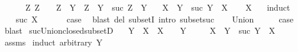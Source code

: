 \begin{isabellebody}
\ \ \ \ \ {\isacharasterisk}{\kern0pt}{\isacharcolon}{\kern0pt}\ {\isachardoublequoteopen}{\isasymAnd}Z{\isachardot}{\kern0pt}\ Z\ {\isasymin}\ {\isasymC}\ {\isasymLongrightarrow}\ Z\ {\isasymsubseteq}\ Y\ {\isasymLongrightarrow}\ Z\ {\isacharequal}{\kern0pt}\ Y\ {\isasymor}\ suc\ Z\ {\isasymsubseteq}\ Y{\isachardoublequoteclose}\isanewline
\ \ \ {\isachardoublequoteopen}X\ {\isasymsubseteq}\ Y\ {\isasymor}\ suc\ Y\ {\isasymsubseteq}\ X{\isachardoublequoteclose}\isanewline
%
\isadelimproof
\ \ %
\endisadelimproof
%
\isatagproof
{}\isamarkupfalse%
\ {\isacartoucheopen}X\ {\isasymin}\ {\isasymC}{\isacartoucheclose}\isanewline
{}\isamarkupfalse%
\ induct\isanewline
\ \ \isamarkupfalse%
\ {\isacharparenleft}{\kern0pt}suc\ X{\isacharparenright}{\kern0pt}\isanewline
\ \ \isamarkupfalse%
\ {\isacharasterisk}{\kern0pt}\ \isamarkupfalse%
\ {\isacharquery}{\kern0pt}case\ \isamarkupfalse%
\ {\isacharparenleft}{\kern0pt}blast\ del{\isacharcolon}{\kern0pt}\ subsetI\ intro{\isacharcolon}{\kern0pt}\ subset{\isacharunderscore}{\kern0pt}suc{\isacharparenright}{\kern0pt}\isanewline
{}\isamarkupfalse%
\isanewline
\ \ \isamarkupfalse%
\ Union\isanewline
\ \ \isamarkupfalse%
\ \isamarkupfalse%
\ {\isacharquery}{\kern0pt}case\ \isamarkupfalse%
\ blast\isanewline
{}\isamarkupfalse%
%
\endisatagproof
{\isafoldproof}%
%
\isadelimproof
\isanewline
%
\endisadelimproof
\isanewline
{}\isamarkupfalse%
\ suc{\isacharunderscore}{\kern0pt}Union{\isacharunderscore}{\kern0pt}closed{\isacharunderscore}{\kern0pt}subsetD{\isacharcolon}{\kern0pt}\isanewline
\ \ \ {\isachardoublequoteopen}Y\ {\isasymsubseteq}\ X{\isachardoublequoteclose}\ \ {\isachardoublequoteopen}X\ {\isasymin}\ {\isasymC}{\isachardoublequoteclose}\ \ {\isachardoublequoteopen}Y\ {\isasymin}\ {\isasymC}{\isachardoublequoteclose}\isanewline
\ \ \ {\isachardoublequoteopen}X\ {\isacharequal}{\kern0pt}\ Y\ {\isasymor}\ suc\ Y\ {\isasymsubseteq}\ X{\isachardoublequoteclose}\isanewline
%
\isadelimproof
\ \ %
\endisadelimproof
%
\isatagproof
{}\isamarkupfalse%
\ assms{\isacharparenleft}{\kern0pt}{}{\isacharcomma}{\kern0pt}{}{\isacharcomma}{\kern0pt}{}{\isacharparenright}{\kern0pt}\isanewline
{}\isamarkupfalse%
\ {\isacharparenleft}{\kern0pt}induct\ arbitrary{\isacharcolon}{\kern0pt}\ Y{\isacharparenright}{\kern0pt}\isanewline

\end{isabellebody}
